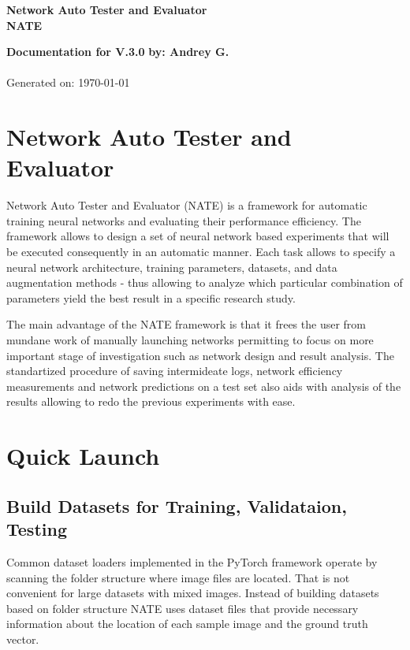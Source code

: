\documentclass[a4paper, 11pt]{article}
\begin{document}
\begin{center}
\textbf{\Large{Network Auto Tester and Evaluator}}\\
\textbf{NATE}
\end{center}

\noindent
\large\textbf{Documentation for V.3.0} \hfill \textbf{by: Andrey G.} \\
\normalsize  \hfill \\
\hfill Generated on: \today 

\tableofcontents

\section{Network Auto Tester and Evaluator}
Network Auto Tester and Evaluator (NATE) is a framework for automatic training neural networks and evaluating their performance efficiency. The framework allows to design a set of neural network based experiments that will be executed consequently in an automatic manner. Each task allows to specify a neural network architecture, training parameters, datasets, and data augmentation methods - thus allowing to analyze which particular combination of parameters yield the best result in a specific research study. 

The main advantage of the NATE framework is that it frees the user from mundane work of manually launching networks permitting to focus on more important stage of investigation such as network design and result analysis. The standartized procedure of saving intermideate logs, network efficiency measurements and network predictions on a test set also aids with analysis of the results allowing to redo the previous experiments with ease.  


\section{Quick Launch}

\subsection{Build Datasets for Training, Validataion, Testing}
Common dataset loaders implemented in the PyTorch framework operate by scanning the folder structure where image files are located. That is not convenient for 
large datasets with mixed images. Instead of building datasets based on folder structure NATE uses dataset files that provide necessary information about the location
of each sample image and the ground truth vector. 
\end{document}

